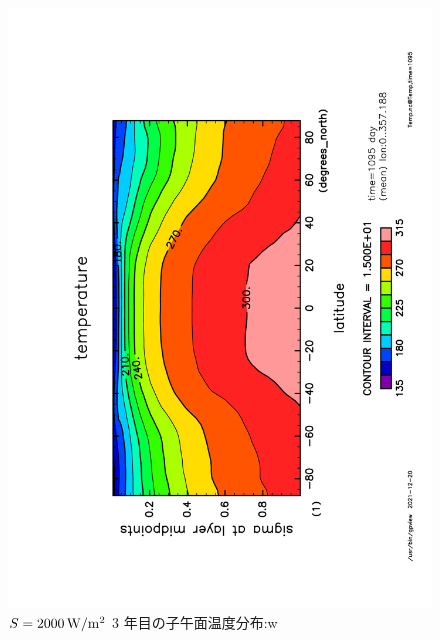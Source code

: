 \documentclass[body]{subfiles}
\begin{document}
\begin{figure}[t]
	\includegraphics[height=\textwidth,angle=-90]{S2000Temp,time=1095.pdf}
	\caption{\(S=2000\hmu{W/m^2}\) 3 年目の子午面温度分布:w
	}
\end{figure}
\end{document}
